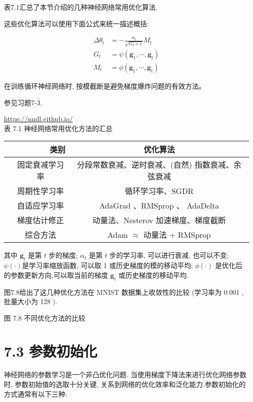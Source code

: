 \documentclass[10pt]{article}
\begin{document}
表7.1汇总了本节介绍的几种神经网络常用优化算法.

这些优化算法可以使用下面公式来统一描述概括:


\begin{align*}
\Delta \theta_{t} & =-\frac{\alpha_{t}}{\sqrt{G_{t}+\epsilon}} M_{t}  \tag{7.32}\\
G_{t} & =\psi\left(\mathbf{g}_{1}, \cdots, \boldsymbol{g}_{t}\right)  \tag{7.33}\\
M_{t} & =\phi\left(\mathbf{g}_{1}, \cdots, \boldsymbol{g}_{t}\right) \tag{7.34}
\end{align*}


在训练循环神经网络时, 按模截断是避免梯度爆炸问题的有效方法。

参见习题7-3.

\href{https://nndl.github.io/}{https://nndl.github.io/}\\
表 7.1 神经网络常用优化方法的汇总

\begin{center}
\begin{tabular}{|c|c|c|}
\hline
\multicolumn{2}{|r|}{类别} & 优化算法 \\
\hline
\multirow{3}{*}{
} & 固定衰减学习率 & 分段常数衰减、逆时衰减、(自然) 指数衰减、余弦衰减 \\
\hline
 & 周期性学习率 & 循环学习率、SGDR \\
\hline
 & 自适应学习率 & AdaGrad 、RMSprop $、$ AdaDelta \\
\hline
 & 梯度估计修正 & 动量法、Nesterov 加速梯度、梯度截断 \\
\hline
 & 综合方法 & Adam $\approx$ 动量法 + RMSprop \\
\hline
\end{tabular}
\end{center}

其中 $\boldsymbol{g}_{t}$ 是第 $t$ 步的梯度; $\alpha_{t}$ 是第 $t$ 步的学习率, 可以进行衰减, 也可以不变; $\psi(\cdot)$是学习率缩放函数, 可以取 1 或历史梯度的模的移动平均; $\phi(\cdot)$ 是优化后的参数更新方向,可以取当前的梯度 $\boldsymbol{g}_{t}$ 或历史梯度的移动平均.

图7.8给出了这几种优化方法在 MNIST 数据集上收敛性的比较 (学习率为 0.001 , 批量大小为 128 ).



图 7.8 不同优化方法的比较

\section*{7.3 参数初始化}
神经网络的参数学习是一个非凸优化问题. 当使用梯度下降法来进行优化网络参数时, 参数初始值的选取十分关键, 关系到网络的优化效率和泛化能力.参数初始化的方式通常有以下三种:
\end{document}
